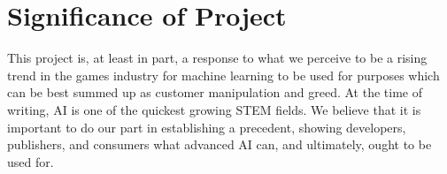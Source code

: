 

\section{Significance of Project}

This project is, at least in part, a response to what we perceive to be a rising trend in the games industry for machine learning to be used for purposes which can be best summed up as customer manipulation and greed. At the time of writing, AI is one of the quickest growing STEM fields. We believe that it is important to do our part in establishing a precedent, showing developers, publishers, and consumers what advanced AI can, and ultimately, ought to be used for.


